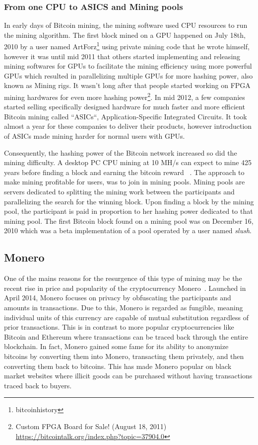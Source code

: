 \subsubsection{From one CPU to ASICS and Mining pools}
In early days of Bitcoin mining, the mining software used CPU resources to run the mining algorithm. The first block mined on a GPU happened on July 18th, 2010 by a user named ArtForz\footnote{bitcoinhistory} using private mining code that he wrote himself, however it was until mid 2011 that others started implementing and releasing mining softwares for GPUs to facilitate the mining efficiency using more powerful GPUs which resulted in parallelizing multiple GPUs for more hashing power, also known as Mining rigs. It wasn't long after that people started working on FPGA mining hardwares for even more hashing power\footnote{Custom FPGA Board for Sale! (August 18, 2011) \url{https://bitcointalk.org/index.php?topic=37904.0}}. In mid 2012, a few companies started selling specifically designed hardware for much faster and more efficient Bitcoin mining called ``ASICs``, Application-Specific Integrated Circuits. It took almost a year for these companies to deliver their products, however introduction of ASICs made mining harder for normal users with GPUs.

Consequently, the hashing power of the Bitcoin network increased so did the mining difficulty. A desktop PC CPU mining at 10 MH/s can expect to mine 425 years before finding a  block and earning the bitcoin reward ~\cite{huang2014botcoin}. The approach to make mining profitable for users, was to join in mining pools. Mining pools are servers dedicated to splitting the mining work between the participants and parallelizing the search for the winning block. Upon finding a block by the mining pool, the participant is paid in proportion to her hashing power dedicated to that mining pool. The first Bitcoin block found on a mining pool was on December 16, 2010 which was a beta implementation of a pool operated by a user named \textit{slush}.

\subsection{Monero}

One of the mains reasons for the resurgence of this type of mining may be the recent rise in price and popularity of the cryptocurrency Monero~\cite{monero}. Launched in April 2014, Monero focuses on privacy by obfuscating the participants and amounts in transactions. Due to this, Monero is regarded as fungible, meaning individual units of this currency are capable of mutual substitution regardless of prior transactions. This is in contrast to more popular cryptocurrencies like Bitcoin and Ethereum where transactions can be traced back through the entire blockchain. In fact, Monero gained some fame for its ability to anonymize bitcoins by converting them into Monero, transacting them privately, and then converting them back to bitcoins. This has made Monero popular on black market websites where illicit goods can be purchased without having transactions traced back to buyers.

